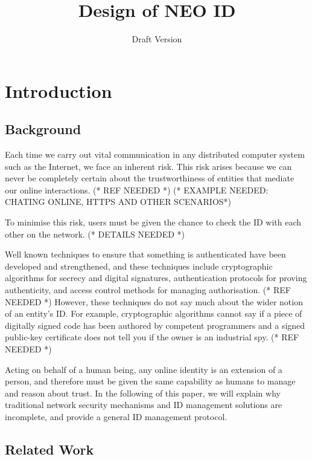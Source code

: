\documentclass{article}
\begin{document}
\title{Design of NEO ID}
\author{Draft Version}
\date{}
\maketitle


\section{Introduction}


\subsection{Background}



Each time we carry out vital communication in any distributed computer system such as the Internet, we face an inherent risk. This risk arises because
we can never be completely certain about the trustworthiness of entities that mediate our online interactions. (* REF NEEDED *) (* EXAMPLE NEEDED:
CHATING ONLINE, HTTPS AND OTHER SCENARIOS*)



To minimise this risk, users must be given the chance to check the ID with each other on the network. (* DETAILS NEEDED *)



Well known techniques to ensure that something is authenticated have been developed and strengthened, and these techniques include cryptographic
algorithms for secrecy and digital signatures, authentication protocols for proving authenticity, and access control methods for managing authorisation.
(* REF NEEDED *) However, these techniques do not say much about the wider notion of an entity{'}s ID. For example, cryptographic algorithms cannot
say if a piece of digitally signed code has been authored by competent programmers and a signed public-key certificate does not tell you if the owner
is an industrial spy. (* REF NEEDED *)



Acting on behalf of a human being, any online identity is an extension of a person, and therefore must be given the same capability as humans to
manage and reason about trust. In the following of this paper, we will explain why traditional network security mechanisms and ID management solutions
are incomplete, and provide a general ID management protocol.


\subsection{Related Work}
\end{document}

